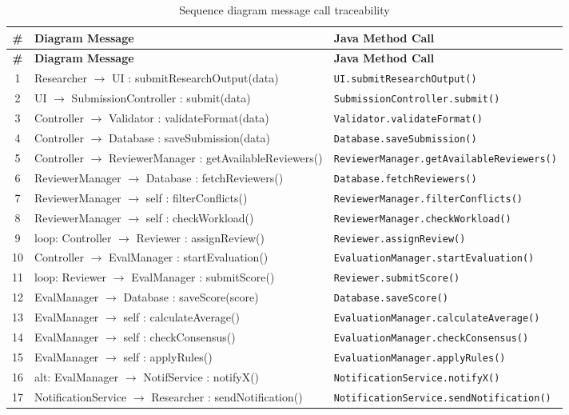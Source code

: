 \documentclass[12pt, a4paper]{article}
\begin{document}
\begin{longtable}{c p{5.5cm} p{6.5cm}}
    \caption{Sequence diagram message call traceability}
    \label{tab:message-traceability} \\
    \toprule
    \textbf{\#} & \textbf{Diagram Message} & \textbf{Java Method Call} \\
    \midrule
    \endfirsthead
    \toprule
    \textbf{\#} & \textbf{Diagram Message} & \textbf{Java Method Call} \\
    \midrule
    \endhead
    1 & Researcher $\rightarrow$ UI : submitResearchOutput(data) & \texttt{UI.submitResearchOutput()} \\
    2 & UI $\rightarrow$ SubmissionController : submit(data) & \texttt{SubmissionController.submit()} \\
    3 & Controller $\rightarrow$ Validator : validateFormat(data) & \texttt{Validator.validateFormat()} \\
    4 & Controller $\rightarrow$ Database : saveSubmission(data) & \texttt{Database.saveSubmission()} \\
    5 & Controller $\rightarrow$ ReviewerManager : getAvailableReviewers() & \texttt{ReviewerManager.getAvailableReviewers()} \\
    6 & ReviewerManager $\rightarrow$ Database : fetchReviewers() & \texttt{Database.fetchReviewers()} \\
    7 & ReviewerManager $\rightarrow$ self : filterConflicts() & \texttt{ReviewerManager.filterConflicts()} \\
    8 & ReviewerManager $\rightarrow$ self : checkWorkload() & \texttt{ReviewerManager.checkWorkload()} \\
    9 & loop: Controller $\rightarrow$ Reviewer : assignReview() & \texttt{Reviewer.assignReview()} \\
    10 & Controller $\rightarrow$ EvalManager : startEvaluation() & \texttt{EvaluationManager.startEvaluation()} \\
    11 & loop: Reviewer $\rightarrow$ EvalManager : submitScore() & \texttt{Reviewer.submitScore()} \\
    12 & EvalManager $\rightarrow$ Database : saveScore(score) & \texttt{Database.saveScore()} \\
    13 & EvalManager $\rightarrow$ self : calculateAverage() & \texttt{EvaluationManager.calculateAverage()} \\
    14 & EvalManager $\rightarrow$ self : checkConsensus() & \texttt{EvaluationManager.checkConsensus()} \\
    15 & EvalManager $\rightarrow$ self : applyRules() & \texttt{EvaluationManager.applyRules()} \\
    16 & alt: EvalManager $\rightarrow$ NotifService : notifyX() & \texttt{NotificationService.notifyX()} \\
    17 & NotificationService $\rightarrow$ Researcher : sendNotification() & \texttt{NotificationService.sendNotification()} \\
    \bottomrule
\end{longtable}
\end{document}
